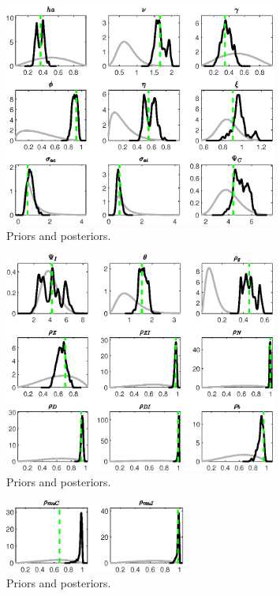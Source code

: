 \begin{figure}[H]
\centering
\includegraphics[width=0.80\textwidth]{BRS_sectoral_wo_fixed_cost/Output/BRS_sectoral_wo_fixed_cost_PriorsAndPosteriors3}
\caption{Priors and posteriors.}\label{Fig:PriorsAndPosteriors:3}
\end{figure}
 
\begin{figure}[H]
\centering
\includegraphics[width=0.80\textwidth]{BRS_sectoral_wo_fixed_cost/Output/BRS_sectoral_wo_fixed_cost_PriorsAndPosteriors4}
\caption{Priors and posteriors.}\label{Fig:PriorsAndPosteriors:4}
\end{figure}
 
\begin{figure}[H]
\centering
\includegraphics[width=0.53\textwidth]{BRS_sectoral_wo_fixed_cost/Output/BRS_sectoral_wo_fixed_cost_PriorsAndPosteriors5}
\caption{Priors and posteriors.}\label{Fig:PriorsAndPosteriors:5}
\end{figure}
 
